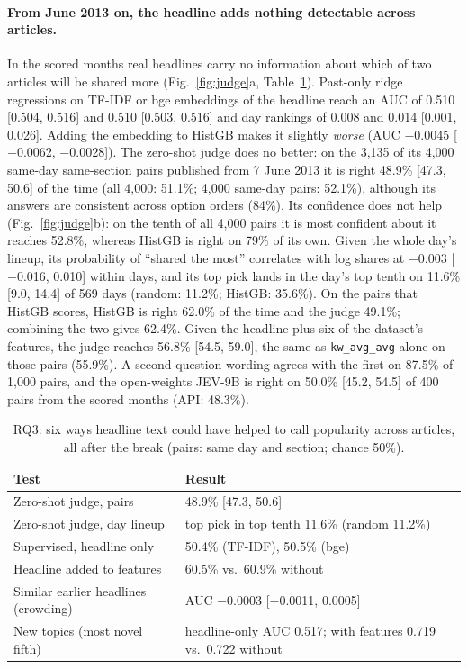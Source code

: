 \documentclass[10pt,a4paper,twocolumn]{article}
\begin{document}
\paragraph{From June 2013 on, the headline adds nothing detectable across articles.} In the scored months real
headlines carry no information about which of two articles will be shared more (Fig.~\ref{fig:judge}a,
Table~\ref{tab:six}). Past-only ridge regressions on TF-IDF or bge embeddings of the headline reach an AUC of
0.510 [0.504, 0.516] and 0.510 [0.503, 0.516] and day rankings of 0.008 and 0.014 [0.001, 0.026]. Adding the
embedding to HistGB makes it slightly \emph{worse} (AUC $-$0.0045 [$-$0.0062, $-$0.0028]). The zero-shot judge does
no better: on the 3{,}135 of its 4{,}000 same-day same-section pairs published from 7 June 2013 it is right 48.9\%
[47.3, 50.6] of the time (all 4{,}000: 51.1\%; 4{,}000 same-day pairs: 52.1\%), although its answers are
consistent across option orders (84\%). Its confidence does not help (Fig.~\ref{fig:judge}b): on the tenth of all
4{,}000 pairs it is most confident about it reaches 52.8\%, whereas HistGB is right on 79\% of its own. Given the whole day's lineup, its
probability of ``shared the most'' correlates with log shares at $-$0.003 [$-$0.016, 0.010] within days, and its top
pick lands in the day's top tenth on 11.6\% [9.0, 14.4] of 569 days (random: 11.2\%; HistGB: 35.6\%). On the pairs
that HistGB scores, HistGB is right 62.0\% of the time and the judge 49.1\%; combining the two gives 62.4\%. Given
the headline plus six of the dataset's features, the judge reaches 56.8\% [54.5, 59.0], the same as
\texttt{kw\_avg\_avg} alone on those pairs (55.9\%). A second question wording agrees with the first on 87.5\% of
1{,}000 pairs, and the open-weights JEV-9B is right on 50.0\% [45.2, 54.5] of 400 pairs from the scored months
(API: 48.3\%).

\begin{table}[t]
\centering\footnotesize
\caption{RQ3: six ways headline text could have helped to call popularity across articles, all after the break
(pairs: same day and section; chance 50\%).}
\label{tab:six}
\setlength{\tabcolsep}{2.5pt}
\begin{tabular}{@{}p{}p{}@{}}
\toprule
Test & Result \\
\midrule
Zero-shot judge, pairs & 48.9\% [47.3, 50.6] \\
Zero-shot judge, day lineup & top pick in top tenth 11.6\% (random 11.2\%) \\
Supervised, headline only & 50.4\% (TF-IDF), 50.5\% (bge) \\
Headline added to features & 60.5\% vs.\ 60.9\% without \\
Similar earlier headlines (crowding) & AUC $-$0.0003 [$-$0.0011, 0.0005] \\
New topics (most novel fifth) & headline-only AUC 0.517; with features 0.719 vs.\ 0.722 without \\
\bottomrule
\end{tabular}
\end{table}
\end{document}
